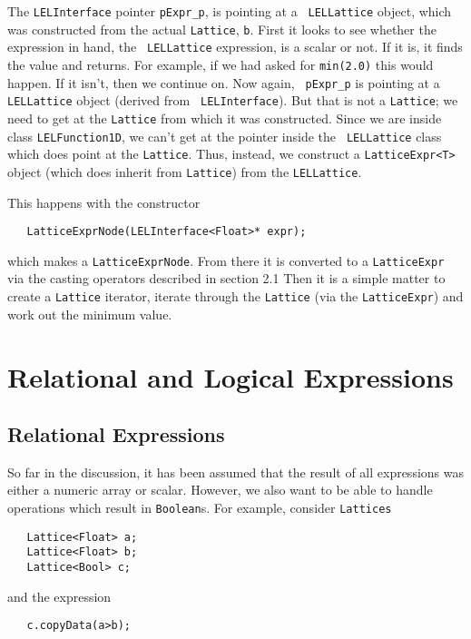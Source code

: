 The {\tt LELInterface} pointer {\tt pExpr\_p}, is pointing at a {\tt
LELLattice} object, which was constructed from the actual {\tt Lattice},
{\tt b}.  First it looks to see whether the expression in hand, the {\tt
LELLattice} expression, is a scalar or not.  If it is, it finds the
value and returns.  For example, if we had asked for {\tt min(2.0)} this
would happen.  If it isn't, then we continue on.  Now again, {\tt
pExpr\_p} is pointing at a {\tt LELLattice} object (derived from {\tt
LELInterface}).  But that is not a {\tt Lattice}; we need to get at the
{\tt Lattice} from which it was constructed.  Since we are inside class
{\tt LELFunction1D}, we can't get at the pointer inside the {\tt
LELLattice} class which does point at the {\tt Lattice}.  Thus, instead,
we construct a {\tt LatticeExpr<T>} object (which does inherit from
{\tt Lattice}) from the {\tt LELLattice}. 

This happens with the constructor

\begin{verbatim}
   LatticeExprNode(LELInterface<Float>* expr);
\end{verbatim}

which makes a {\tt LatticeExprNode}.  From there it is converted to
a {\tt LatticeExpr} via the casting operators described in section 2.1
Then it is a simple matter to create a {\tt Lattice} iterator, iterate through
the {\tt Lattice} (via the {\tt LatticeExpr}) and work out the minimum value.


\section {Relational and Logical Expressions}

\subsection {Relational Expressions}

So far in the discussion, it has been assumed that the result of all
expressions was either a numeric array or scalar.  However, we also want
to be able to handle operations which result in {\tt Boolean}s.  For
example, consider {\tt Lattices}

\begin{verbatim}
   Lattice<Float> a;
   Lattice<Float> b;
   Lattice<Bool> c;
\end{verbatim}

and the expression

\begin{verbatim}
   c.copyData(a>b);
\end{verbatim}

